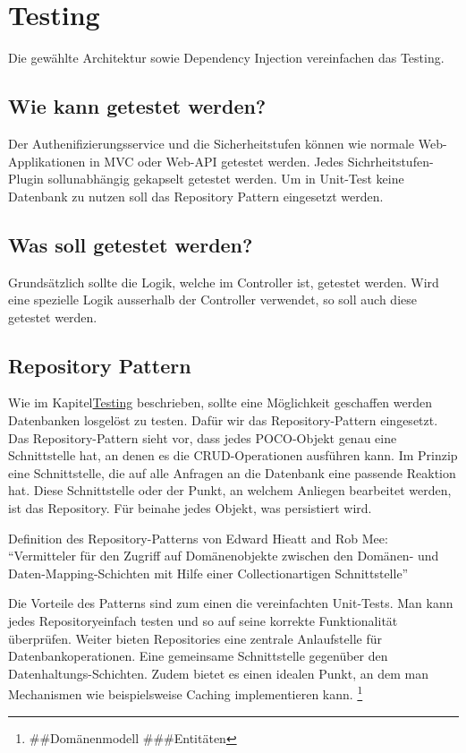 \hypertarget{testing}{\section{Testing}\label{testing}}

Die gewählte Architektur sowie Dependency Injection vereinfachen das
Testing.

\subsection{Wie kann getestet werden?}\label{wie-kann-getestet-werden}

Der Authenifizierungsservice und die Sicherheitstufen können wie normale
Web-Applikationen in MVC oder Web-API getestet werden. Jedes
Sichrheitstufen-Plugin sollunabhängig gekapselt getestet werden. Um in
Unit-Test keine Datenbank zu nutzen soll das Repository Pattern
eingesetzt werden.

\subsection{Was soll getestet werden?}\label{was-soll-getestet-werden}

Grundsätzlich sollte die Logik, welche im Controller ist, getestet
werden. Wird eine spezielle Logik ausserhalb der Controller verwendet,
so soll auch diese getestet werden.

\subsection{Repository Pattern}\label{repository-pattern}

Wie im Kapitel\protect\hyperlink{testing}{Testing} beschrieben, sollte
eine Möglichkeit geschaffen werden Datenbanken losgelöst zu testen.
Dafür wir das Repository-Pattern eingesetzt. Das Repository-Pattern
sieht vor, dass jedes POCO-Objekt genau eine Schnittstelle hat, an denen
es die CRUD-Operationen ausführen kann. Im Prinzip eine Schnittstelle,
die auf alle Anfragen an die Datenbank eine passende Reaktion hat. Diese
Schnittstelle oder der Punkt, an welchem Anliegen bearbeitet werden, ist
das Repository. Für beinahe jedes Objekt, was persistiert wird.

Definition des Repository-Patterns von Edward Hieatt and Rob Mee:
``Vermitteler für den Zugriff auf Domänenobjekte zwischen den Domänen-
und Daten-Mapping-Schichten mit Hilfe einer Collectionartigen
Schnittstelle''

Die Vorteile des Patterns sind zum einen die vereinfachten Unit-Tests.
Man kann jedes Repositoryeinfach testen und so auf seine korrekte
Funktionalität überprüfen. Weiter bieten Repositories eine zentrale
Anlaufstelle für Datenbankoperationen. Eine gemeinsame Schnittstelle
gegenüber den Datenhaltungs-Schichten. Zudem bietet es einen idealen
Punkt, an dem man Mechanismen wie beispielsweise Caching implementieren
kann. \footnote{\autocite{repository} \#\#Domänenmodell \#\#\#Entitäten}

